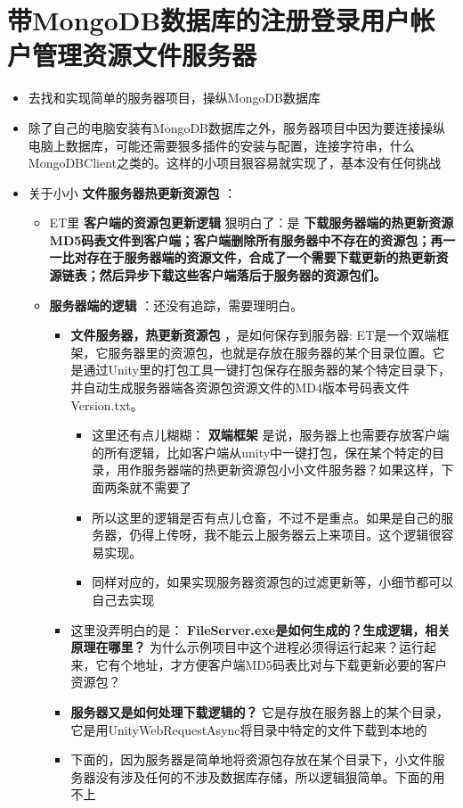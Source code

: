 \documentclass[9pt, b5paper]{article}
\begin{document}
\section{带MongoDB数据库的注册登录用户帐户管理资源文件服务器}
\label{sec-5}
\begin{itemize}
\item 去找和实现简单的服务器项目，操纵MongoDB数据库
\item 除了自己的电脑安装有MongoDB数据库之外，服务器项目中因为要连接操纵电脑上数据库，可能还需要狠多插件的安装与配置，连接字符串，什么MongoDBClient之类的。这样的小项目狠容易就实现了，基本没有任何挑战
\item 关于小小 \textbf{文件服务器热更新资源包} ：
\begin{itemize}
\item ET里 \textbf{客户端的资源包更新逻辑} 狠明白了：是 \textbf{下载服务器端的热更新资源MD5码表文件到客户端；客户端删除所有服务器中不存在的资源包；再一一比对存在于服务器端的资源文件，合成了一个需要下载更新的热更新资源链表；然后异步下载这些客户端落后于服务器的资源包们。}
\item \textbf{服务器端的逻辑} ：还没有追踪，需要理明白。
\begin{itemize}
\item \textbf{文件服务器，热更新资源包} ，是如何保存到服务器: ET是一个双端框架，它服务器里的资源包，也就是存放在服务器的某个目录位置。它是通过Unity里的打包工具一键打包保存在服务器的某个特定目录下，并自动生成服务器端各资源包资源文件的MD4版本号码表文件Version.txt。
\begin{itemize}
\item 这里还有点儿糊糊： \textbf{双端框架} 是说，服务器上也需要存放客户端的所有逻辑，比如客户端从unity中一键打包，保在某个特定的目录，用作服务器端的热更新资源包小小文件服务器？如果这样，下面两条就不需要了
\item 所以这里的逻辑是否有点儿仓畜，不过不是重点。如果是自己的服务器，仍得上传呀，我不能云上服务器云上来项目。这个逻辑很容易实现。
\item 同样对应的，如果实现服务器资源包的过滤更新等，小细节都可以自己去实现
\end{itemize}
\item 这里没弄明白的是： \textbf{FileServer.exe是如何生成的？生成逻辑，相关原理在哪里？} 为什么示例项目中这个进程必须得运行起来？运行起来，它有个地址，才方便客户端MD5码表比对与下载更新必要的客户资源包？
\item \textbf{服务器又是如何处理下载逻辑的？} 它是存放在服务器上的某个目录，它是用UnityWebRequestAsync将目录中特定的文件下载到本地的
\item 下面的，因为服务器是简单地将资源包存放在某个目录下，小文件服务器没有涉及任何的不涉及数据库存储，所以逻辑狠简单。下面的用不上

\end{itemize}
\end{itemize}
\end{itemize}
\end{document}
